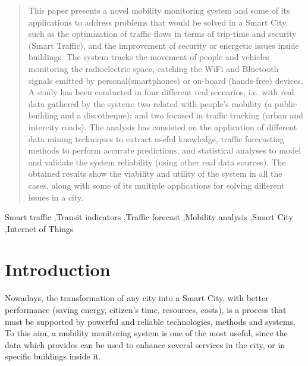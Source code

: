\documentclass[preprint]{elsarticle}
\begin{document}
\begin{frontmatter}
%
%
\begin{abstract}
This paper presents a novel mobility monitoring system and some of its applications to address problems that would be solved in a Smart City, such as the optimization of traffic flows in terms of trip-time and security (Smart Traffic), and the improvement of security or energetic issues inside buildings.
The system tracks the movement of people and vehicles monitoring the
radioelectric space, catching the  WiFi and Bluetooth signals emitted by personal(smartphones) or on-board (hands-free) devices. 
A study has been conducted in four different real scenarios,
i.e. with real data gathered by the system: two related with people's
mobility (a public building and a discotheque); and two focused in
traffic tracking (urban and intercity roads). 
The analysis has consisted on the application of different data mining techniques to extract useful knowledge, traffic forecasting methods to perform accurate predictions, and statistical analyses to model and validate the system
reliability (using other real data sources).
The obtained results show the viability and utility of the system in all the cases, along with some of its multiple applications for solving different issues in a city. 
\end{abstract}

%
%
\begin{keyword}
Smart traffic \sep Transit indicators \sep Traffic forecast \sep Mobility analysis \sep Smart City \sep Internet of Things
\end{keyword}

\end{frontmatter}



\section{Introduction}
\label{sec:intro}

Nowadays, the transformation of any city into a Smart City, with better performance (saving energy, citizen's time, resources, costs), is a process that must be supported by powerful and reliable technologies, methods and systems. 
To this aim, a mobility monitoring system is one of the most useful, since the data which provides can be used to enhance several services in the city, or in specific buildings inside it.
\end{document}
